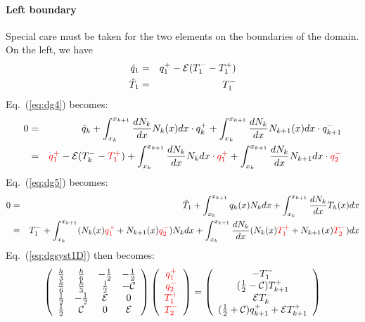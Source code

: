 \paragraph{Left boundary}
Special care must be taken for the two elements on the boundaries of the domain. 
On the left, we have 
\begin{eqnarray}
\hat{q}_1 &=& q_1^+ -{\cal E} (T_1^--T_1^+) \nonumber  \\
\hat{T}_1 &=& T_1^- \nonumber
\end{eqnarray}
Eq.~(\ref{eq:dg4}) becomes:
\begin{eqnarray}
0 
&=& \hat{q}_k   
+ \int_{x_k}^{x_{k+1}} \frac{dN_k}{dx} N_k(x) dx \cdot q_k^+ 
+ \int_{x_k}^{x_{k+1}} \frac{dN_k}{dx} N_{k+1}(x) dx \cdot q_{k+1}^- \nonumber\\ 
&=& 
{\color{red}q_1^+} - {\cal E} (T_k^- - {\color{red}T_1^+}) 
+ \int_{x_k}^{x_{k+1}} \frac{dN_k}{dx} N_k dx \cdot {\color{red}q_1^+ }
+ \int_{x_k}^{x_{k+1}} \frac{dN_k}{dx} N_{k+1} dx \cdot {\color{red} q_{2}^-}
\end{eqnarray}
Eq.~(\ref{eq:dg5}) becomes:
\begin{eqnarray}
0
&=& \hat{T}_1     
+ \int_{x_k}^{x_{k+1}}  q_h(x) N_k dx
+ \int_{x_k}^{x_{k+1}} \frac{dN_k}{dx} T_h(x) dx  \nonumber\\
&=& 
T_1^-  
+ \int_{x_k}^{x_{k+1}}  (N_k(x) {\color{red}q_1^+} + N_{k+1}(x) {\color{red}q_{2}^-}) N_k dx
+ \int_{x_k}^{x_{k+1}} \frac{dN_k}{dx} (N_k(x) {\color{red}T_1^+} + N_{k+1}(x) {\color{red}T_{2}^-})   dx 
\end{eqnarray}
Eq.~(\ref{eq:dgsyst1D}) then becomes:
\begin{eqnarray}
\left(
\begin{array}{cccc}
\frac{h}{3}    &  \frac{h}{6} & -\frac{1}{2}   &-\frac{1}{2} \\
\frac{h}{6}    &  \frac{h}{3} & \frac{1}{2} & -{\cal C} \\
\frac{1}{2}    & -\frac{1}{2} & {\cal E} & 0\\
\frac{1}{2} & {\cal C} & 0 & {\cal E}
\end{array}
\right) \left(
\begin{array}{c}
     \color{red}{q_1^+}  \\
     \color{red}{q_{2}^-} \\
     \color{red}{T_1^+} \\
     \color{red}{T_{2}^-}
\end{array}
\right)=\left(
\begin{array}{c}
     -T_1^-  \\
      (\frac{1}{2}-{\cal{C}}) T_{k+1}^+ \\
     {\cal{E}} T_k^-  \\
      (\frac{1}{2}+{\cal{C}})q_{k+1}^++{\cal{E}} T_{k+1}^+
\end{array}
\right)
\label{eq:dgsyst1Dleft}
\end{eqnarray}








